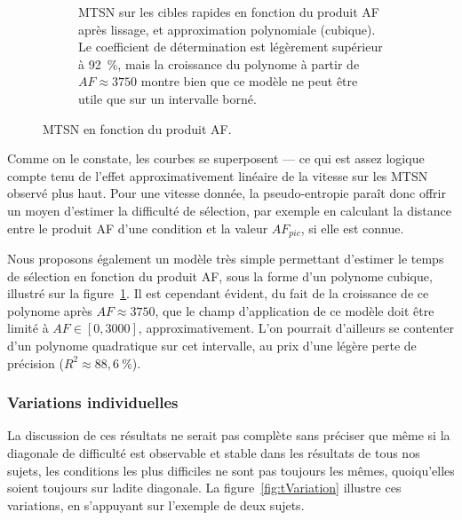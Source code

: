 \begin{figure}[!htb]
\begin{subfigure}[t]{\textwidth}
			\caption{MTSN sur les cibles rapides en fonction du produit AF après lissage, et approximation polynomiale (cubique). Le coefficient de détermination est légèrement supérieur à 92~\%{}, mais la croissance du polynome à partir de $AF \approx 3750$ montre bien que ce modèle ne peut être utile que sur un intervalle borné.}
			\label{fig:tAF_smooth}
		\end{subfigure}
		\caption[MTSN en fonction du produit AF]{MTSN en fonction du produit AF.}
		\label{fig:tAF}
	\end{figure}
	
	Comme on le constate, les courbes se superposent --- ce qui est assez logique compte tenu de l'effet approximativement linéaire de la vitesse sur les MTSN observé plus haut. Pour une vitesse donnée, la pseudo-entropie paraît donc offrir un moyen d'estimer la difficulté de sélection, par exemple en calculant la distance entre le produit AF d'une condition et la valeur $AF_{pic}$, si elle est connue.
	
	Nous proposons également un modèle très simple permettant d'estimer le temps de sélection en fonction du produit AF, sous la forme d'un polynome cubique, illustré sur la figure~\ref{fig:tAF_smooth}. Il est cependant évident, du fait de la croissance de ce polynome après $AF \approx 3750$, que le champ d'application de ce modèle doit être limité à $AF \in [0, 3000]$, approximativement. L'on pourrait d'ailleurs se contenter d'un polynome quadratique sur cet intervalle, au prix d'une légère perte de précision ($R^{2} \approx 88,6~\%{}$).
	
	\subsubsection{Variations individuelles}
	La discussion de ces résultats ne serait pas complète sans préciser que même si la \og diagonale de difficulté \fg{} est observable et stable dans les résultats de tous nos sujets, les conditions les plus difficiles ne sont pas toujours les mêmes, quoiqu'elles soient toujours sur ladite diagonale. La figure~\ref{fig:tVariation} illustre ces variations, en s'appuyant sur l'exemple de deux sujets.
	
